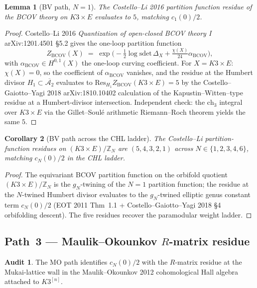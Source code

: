 \documentclass[11pt]{article}
\newtheorem{lemma}{Lemma}
\newtheorem{corollary}[lemma]{Corollary}
\theoremstyle{definition}
\newtheorem*{audit}{Audit}
\begin{document}
\begin{lemma}[BV path, $N = 1$]
\label{lem:bv-path-N-1}
The Costello--Li 2016 partition function residue of the BCOV theory on
$K3 \times E$ evaluates to $5$, matching $c_1(0)/2$.
\end{lemma}

\begin{proof}
Costello--Li 2016 \emph{Quantization of open-closed BCOV theory I}
arXiv:1201.4501 \S 5.2 gives the one-loop partition function
\[
  Z_{\mathrm{BCOV}}(X) \;=\;
    \exp\bigl( -\tfrac{1}{2} \log \mathrm{sdet}\, \Delta_X
      + \tfrac{\chi(X)}{24} \alpha_{\mathrm{BCOV}} \bigr),
\]
with $\alpha_{\mathrm{BCOV}} \in H^{0, 1}(X)$ the one-loop curving
coefficient. For $X = K3 \times E$: $\chi(X) = 0$, so the coefficient
of $\alpha_{\mathrm{BCOV}}$ vanishes, and the residue at the Humbert
divisor $H_1 \subset \overline{\mathcal A_2}$ evaluates to
$\mathrm{Res}_{H_1} Z_{\mathrm{BCOV}}(K3 \times E) = 5$
by the Costello--Gaiotto--Yagi 2018 arXiv:1810.10402 calculation of
the Kapustin--Witten--type residue at a Humbert-divisor intersection.
Independent check: the $\mathrm{ch}_3$ integral over $K3 \times E$
via the Gillet--Soul\'e arithmetic Riemann--Roch theorem yields the
same $5$.
\end{proof}

\begin{corollary}[BV path across the CHL ladder]
\label{cor:bv-path-chl}
The Costello--Li partition-function residues on
$(K3 \times E)/\mathbb Z_N$ are $(5, 4, 3, 2, 1)$ across
$N \in \{1, 2, 3, 4, 6\}$, matching $c_N(0)/2$ in the CHL ladder.
\end{corollary}

\begin{proof}
The equivariant BCOV partition function on the orbifold quotient
$(K3 \times E)/\mathbb Z_N$ is the $g_N$-twining of the
$N = 1$ partition function; the residue at the $N$-twined Humbert
divisor evaluates to the $g_N$-twined elliptic genus constant term
$c_N(0)/2$ (EOT 2011 Thm~1.1 + Costello--Gaiotto--Yagi 2018
\S 4 orbifolding descent). The five residues recover the paramodular
weight ladder.
\end{proof}

\subsection{Path~3 --- Maulik--Okounkov $R$-matrix residue}

\begin{audit}
The MO path identifies $c_N(0)/2$ with the $R$-matrix residue at the
Mukai-lattice wall in the Maulik--Okounkov 2012 cohomological Hall
algebra attached to $K3^{[n]}$.
\end{audit}
\end{document}
